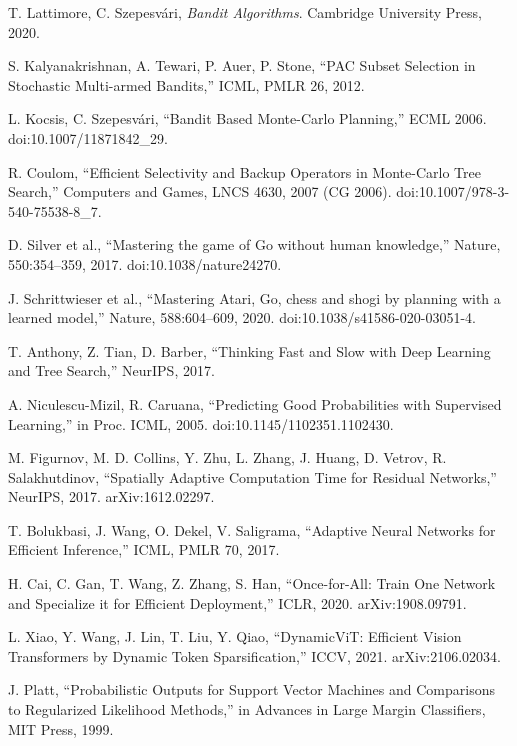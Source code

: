 \begin{thebibliography}{99}
T. Lattimore, C. Szepesvári, \emph{Bandit Algorithms}. Cambridge University Press, 2020.

S. Kalyanakrishnan, A. Tewari, P. Auer, P. Stone, ``PAC Subset Selection in Stochastic Multi-armed Bandits,'' ICML, PMLR 26, 2012.

L. Kocsis, C. Szepesvári, ``Bandit Based Monte-Carlo Planning,'' ECML 2006. doi:10.1007/11871842\_29.

R. Coulom, ``Efficient Selectivity and Backup Operators in Monte-Carlo Tree Search,'' Computers and Games, LNCS 4630, 2007 (CG 2006). doi:10.1007/978-3-540-75538-8\_7.

D. Silver et al., ``Mastering the game of Go without human knowledge,'' Nature, 550:354--359, 2017. doi:10.1038/nature24270.

J. Schrittwieser et al., ``Mastering Atari, Go, chess and shogi by planning with a learned model,'' Nature, 588:604--609, 2020. doi:10.1038/s41586-020-03051-4.

T. Anthony, Z. Tian, D. Barber, ``Thinking Fast and Slow with Deep Learning and Tree Search,'' NeurIPS, 2017.

A. Niculescu-Mizil, R. Caruana, ``Predicting Good Probabilities with Supervised Learning,'' in Proc. ICML, 2005. doi:10.1145/1102351.1102430.

M. Figurnov, M. D. Collins, Y. Zhu, L. Zhang, J. Huang, D. Vetrov, R. Salakhutdinov, ``Spatially Adaptive Computation Time for Residual Networks,'' NeurIPS, 2017. arXiv:1612.02297.

T. Bolukbasi, J. Wang, O. Dekel, V. Saligrama, ``Adaptive Neural Networks for Efficient Inference,'' ICML, PMLR 70, 2017.

H. Cai, C. Gan, T. Wang, Z. Zhang, S. Han, ``Once-for-All: Train One Network and Specialize it for Efficient Deployment,'' ICLR, 2020. arXiv:1908.09791.

L. Xiao, Y. Wang, J. Lin, T. Liu, Y. Qiao, ``DynamicViT: Efficient Vision Transformers by Dynamic Token Sparsification,'' ICCV, 2021. arXiv:2106.02034.

J. Platt, ``Probabilistic Outputs for Support Vector Machines and Comparisons to Regularized Likelihood Methods,'' in Advances in Large Margin Classifiers, MIT Press, 1999.

\end{thebibliography}

